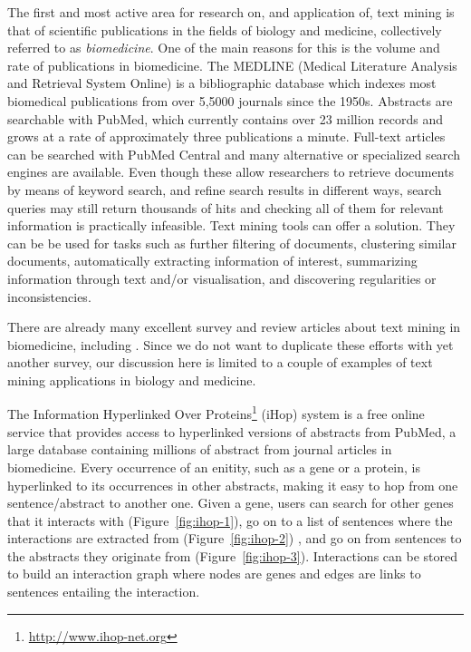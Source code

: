 The first and most active area for research on, and application of, text mining is that of scientific publications in the fields of biology and medicine, collectively referred to as \emph{biomedicine}.
One of the main reasons for this is the volume and rate of publications in biomedicine.
The MEDLINE (Medical Literature Analysis and Retrieval System Online) is a bibliographic database which indexes most biomedical publications from over 5,5000 journals since the 1950s.
Abstracts are searchable with PubMed, which currently contains over 23 million records and grows at a rate of approximately three publications a minute.
Full-text articles can be searched with PubMed Central and many alternative or specialized search engines are available. 
Even though these allow researchers to retrieve documents by means of keyword search, and refine search results in different ways, search queries may still return thousands of hits and checking all of them for relevant information is practically infeasible.
Text mining tools can offer a solution.
They can be be used for tasks such as further filtering of documents, clustering similar documents, automatically extracting information of interest, summarizing information through text and/or visualisation, and discovering regularities or inconsistencies.

There are already many excellent survey and review articles about text mining in biomedicine, including
\citep{Neves2012Survey,Simpson2012Biomedical,Andronis2011Literature,Ananiadou2010Event,RodriguezEsteban2009Biomedical,Zweigenbaum2009Advanced,Cohen2008Getting,Zweigenbaum2007Frontiers,Ananiadou2006,Erhardt2006Status,JenEA06,Spasic2005Text,Cohen2005Survey,Krauthammer2004Term,Blake2011Text,Krallinger2010Analysis}.
Since we do not want to duplicate these efforts with yet another survey, our discussion here is limited to a couple of examples of text mining applications in biology and medicine.

The Information Hyperlinked Over Proteins\footnote{\url{http://www.ihop-net.org}} (iHop) system \citep{hoffmann2004gene} is a free online service that provides access to hyperlinked versions of abstracts from PubMed, a large database containing millions of abstract from journal articles in biomedicine.
Every occurrence of an enitity, such as a gene or a protein, is hyperlinked to its occurrences in other abstracts, making it easy to hop from one sentence/abstract to another one.
Given a gene, users can search for other genes that it interacts with (Figure~\ref{fig:ihop-1}), go on to a list of sentences where the interactions are extracted from (Figure~\ref{fig:ihop-2}) , and go on from sentences to the abstracts they originate from  (Figure~\ref{fig:ihop-3}).   
Interactions can be stored to build an interaction graph where nodes are genes and edges are links to sentences entailing the interaction. 

